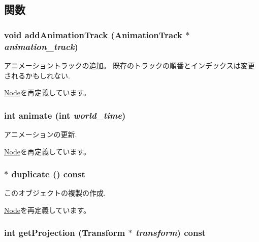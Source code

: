 \subsection{関数}
\hypertarget{classm3g_1_1Camera_415c0b110f95410ded9b85e5d99a496b}{
\subsubsection[{addAnimationTrack}]{\setlength{\rightskip}{0pt plus 5cm}void addAnimationTrack ({\bf AnimationTrack} $\ast$ {\em animation\_\-track})}}
\label{classm3g_1_1Camera_415c0b110f95410ded9b85e5d99a496b}


アニメーショントラックの追加。 既存のトラックの順番とインデックスは変更されるかもしれない. 

\hyperlink{classm3g_1_1Node_415c0b110f95410ded9b85e5d99a496b}{Node}を再定義しています。\hypertarget{classm3g_1_1Camera_8aad1ceab4c2a03609c8a42324ce484d}{
\subsubsection[{animate}]{\setlength{\rightskip}{0pt plus 5cm}int animate (int {\em world\_\-time})}}
\label{classm3g_1_1Camera_8aad1ceab4c2a03609c8a42324ce484d}


アニメーションの更新. 

\hyperlink{classm3g_1_1Node_8aad1ceab4c2a03609c8a42324ce484d}{Node}を再定義しています。\hypertarget{classm3g_1_1Camera_6279f7f8ab52af683fadd193d7694f2d}{
\subsubsection[{duplicate}]{ $\ast$ duplicate () const}}
\label{classm3g_1_1Camera_6279f7f8ab52af683fadd193d7694f2d}


このオブジェクトの複製の作成. 

\hyperlink{classm3g_1_1Node_0b9f7531a4b56d34f47aeb1fff0d37e0}{Node}を再定義しています。\hypertarget{classm3g_1_1Camera_9e0c204df146342990703acb744954b1}{
\subsubsection[{getProjection}]{\setlength{\rightskip}{0pt plus 5cm}int getProjection ({\bf Transform} $\ast$ {\em transform}) const}}
\label{classm3g_1_1Camera_9e0c204df146342990703acb744954b1}


